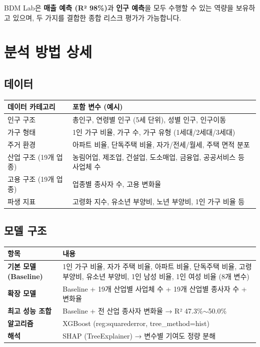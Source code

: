 \documentclass[11pt, a4paper]{article}
\begin{document}
BDM Lab은 \textbf{매출 예측 (R² 98\%)}과 \textbf{인구 예측}을 모두 수행할 수 있는 역량을 보유하고 있으며, 두 가지를 결합한 종합 리스크 평가가 가능합니다.

\newpage

\section{분석 방법 상세}

\subsection{데이터}

\begin{table}[H]
\centering
\renewcommand{\arraystretch}{1.2}
\begin{tabularx}{\textwidth}{L{4.5cm} X}
\toprule
{} \textbf{데이터 카테고리} & \textbf{포함 변수 (예시)} \\
\midrule
인구 구조 & 총인구, 연령별 인구 (5세 단위), 성별 인구, 인구이동 \\[3pt]
가구 형태 & 1인 가구 비율, 가구 수, 가구 유형 (1세대/2세대/3세대) \\[3pt]
주거 환경 & 아파트 비율, 단독주택 비율, 자가/전세/월세, 주택 면적 분포 \\[3pt]
산업 구조 (19개 업종) & 농림어업, 제조업, 건설업, 도소매업, 금융업, 공공서비스 등 사업체 수 \\[3pt]
고용 구조 (19개 업종) & 업종별 종사자 수, 고용 변화율 \\[3pt]
파생 지표 & 고령화 지수, 유소년 부양비, 노년 부양비, 1인 가구 비율 등 \\
\bottomrule
\end{tabularx}
\end{table}

\subsection{모델 구조}

\begin{table}[H]
\centering
\renewcommand{\arraystretch}{1.3}
\begin{tabularx}{\textwidth}{L{4cm} X}
\toprule
{} \textbf{항목} & \textbf{내용} \\
\midrule
\textbf{기본 모델 (Baseline)} & 1인 가구 비율, 자가 주택 비율, 아파트 비율, 단독주택 비율, 고령 부양비, 유소년 부양비, 1인 남성 비율, 1인 여성 비율 (8개 변수) \\[4pt]
\textbf{확장 모델} & Baseline + 19개 산업별 사업체 수 + 19개 산업별 종사자 수 + 변화율 \\[4pt]
\textbf{최고 성능 조합} & Baseline + 전 산업 종사자 변화율 → R² 47.3\%$\sim$50.0\% \\[4pt]
\textbf{알고리즘} & XGBoost (reg:squarederror, tree\_method=hist) \\[4pt]
\textbf{해석} & SHAP (TreeExplainer) → 변수별 기여도 정량 분해 \\
\bottomrule
\end{tabularx}
\end{table}
\end{document}
